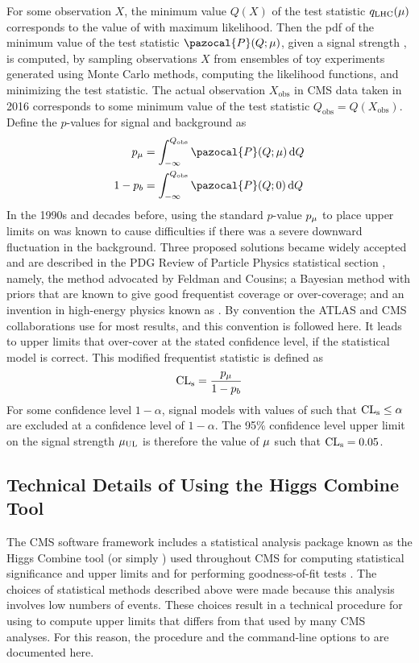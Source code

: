 For some observation $X$, the minimum value $Q(X)$ of the test statistic $q_\text{LHC}(\mu)$ corresponds to the value of \sigstr with maximum likelihood.
Then the pdf of the minimum value of the test statistic $\pazocal{P}(Q;\sigstr)$, given a signal strength \sigstr, is computed, by sampling observations $X$ from ensembles of toy experiments generated using Monte Carlo methods, computing the likelihood functions, and minimizing the test statistic.
The actual observation $X_\text{obs}$ in CMS data taken in 2016 corresponds to some minimum value of the test statistic $Q_\text{obs} = Q(X_\text{obs})$.
Define the $p$-values for signal and background as
\begin{align}
  p_\sigstr   &= \int_{-\infty}^{Q_\text{obs}}{\pazocal{P}(Q;\sigstr)\dd{Q}}\\
  1 - p_b     &= \int_{-\infty}^{Q_\text{obs}}{\pazocal{P}(Q;0)      \dd{Q}}
  \label{eq:dd:pvalues}
\end{align}
In the 1990s and decades before, using the standard $p$-value $p_\mu$ to place upper limits on \sigstr was known to cause difficulties if there was a severe downward fluctuation in the background.
Three proposed solutions became widely accepted and are described in the PDG Review of Particle Physics statistical section \cite{CowanPDGStats}, namely, the method advocated by Feldman and Cousins; a Bayesian method with priors that are known to give good frequentist coverage or over-coverage; and an invention in high-energy physics known as \CLs.
By convention the ATLAS and CMS collaborations use \CLs \cite{Read:CLs, Junk:CLs} for most results, and this convention is followed here.
It leads to upper limits that over-cover at the stated confidence level, if the statistical model is correct.
This modified frequentist statistic \CLs is defined as
\begin{equation}
  \text{CL}_\text{s} = \frac{p_\mu}{1-p_b}
  \label{eq:CLs}
\end{equation}
For some confidence level $1-\alpha$, signal models with values of \CLs such that $\text{CL}_\text{s} \leq \alpha$ are excluded at a confidence level of $1-\alpha$.
The 95\% confidence level upper limit on the signal strength $\mu_\text{UL}$ is therefore the value of $\mu$ such that $\text{CL}_\text{s} = 0.05$.

\subsection{Technical Details of Using the Higgs Combine Tool}
\label{sec:dd:combine}
The CMS software framework includes a statistical analysis package known as the Higgs Combine tool (or simply \combine) used throughout CMS for computing statistical significance and upper limits and for performing goodness-of-fit tests \cite{CombineManual}.
The choices of statistical methods described above were made because this analysis involves low numbers of events.
These choices result in a technical procedure for using \combine to compute upper limits that differs from that used by many CMS analyses.
For this reason, the procedure and the command-line options to \combine are documented here.

